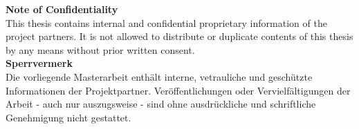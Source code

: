 
\vspace*{\fill}
\begingroup
\centering
\large
\textbf{Note of Confidentiality}\\
This thesis contains internal and confidential proprietary information of the project partners.
It is not allowed to distribute or duplicate contents of this thesis 
by any means without prior written consent.\\
\vspace{3cm}
\large
\textbf{Sperrvermerk}\\
Die vorliegende Masterarbeit enth\"alt interne, vetrauliche und gesch\"utzte Informationen der Projektpartner.
Ver\"offentlichungen oder Vervielf\"altigungen der Arbeit - auch nur auszugsweise - sind ohne ausdr\"uckliche und schriftliche
Genehmigung nicht gestattet.\\
\endgroup
\vspace*{\fill}